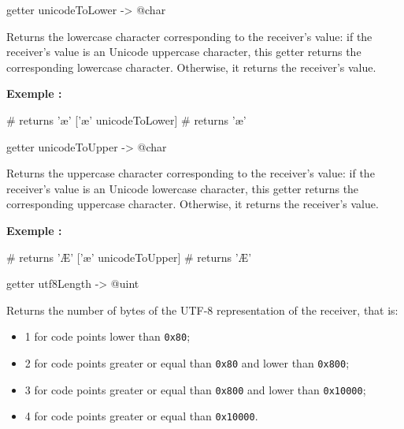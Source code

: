 
\begin{galgas3}
getter unicodeToLower -> @char
\end{galgas3}

Returns the lowercase character corresponding to the receiver's value: if the receiver's value is an Unicode uppercase character, this getter returns the corresponding lowercase character. Otherwise, it returns the receiver's value.

\textbf{Exemple :}
\begin{galgas3}
['Æ' unicodeToLower] # returns 'æ'
['æ' unicodeToLower] # returns 'æ'
\end{galgas3}





\begin{galgas3}
getter unicodeToUpper -> @char
\end{galgas3}

Returns the uppercase character corresponding to the receiver's value: if the receiver's value is an Unicode lowercase character, this getter returns the corresponding uppercase character. Otherwise, it returns the receiver's value.

\textbf{Exemple :}
\begin{galgas3}
['Æ' unicodeToUpper] # returns 'Æ'
['æ' unicodeToUpper] # returns 'Æ'
\end{galgas3}





\begin{galgas3}
getter utf8Length -> @uint
\end{galgas3}

Returns the number of bytes of the UTF-8 representation of the receiver, that is:
\begin{itemize}
  \item 1 for code points lower than \texttt{0x80};
  \item 2 for code points greater or equal than \texttt{0x80} and lower than \texttt{0x800};
  \item 3 for code points greater or equal than \texttt{0x800} and lower than \texttt{0x10000};
  \item 4 for code points greater or equal than \texttt{0x10000}.
\end{itemize}






